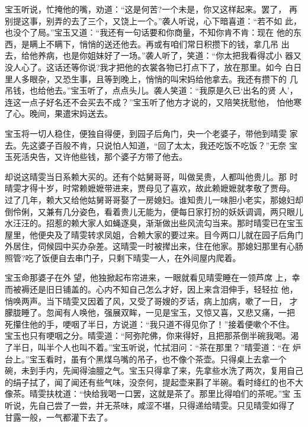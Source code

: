 宝玉听说，忙掩他的嘴，劝道：“这是何苦?一个未是，你又这样起来。罢了，
再别提这事，别弄的去了三个，又饶上一个。”袭人听说，心下暗喜道：“若不如
此，也没个了局。”宝玉又道：“我还有一句话要和你商量，不知你肯不肯：现在
他的东西，是瞒上不瞒下，悄悄的送还他去。再或有咱们常日积攒下的钱，拿几吊
出去，给他养病，也是你姐妹好了一场。”袭人听了，笑道：“你太把我看得忒小
器又没人心了。这话还等你说?我才把他的衣裳各物已打点下了，放在那里。如今
白日里人多眼杂，又恐生事，且等到晚上，悄悄的叫宋妈给他拿去。我还有攒下的
几吊钱，也给他去。”宝玉听了，点点头儿。袭人笑道：“我原是久已‘出名的贤
人’，连这一点子好名还不会买去不成？”宝玉听了他方才说的，又陪笑抚慰他，
怕他寒了心。晚间，果遣宋妈送去。

宝玉将一切人稳住，便独自得便，到园子后角门，央一个老婆子，带他到晴雯
家去。先这婆子百般不肯，只说怕人知道，“回了太太，我还吃饭不吃饭？”无奈
宝玉死活央告，又许他些钱，那个婆子方带了他去。

却说这晴雯当日系赖大买的。还有个姑舅哥哥，叫做吴贵，人都叫他贵儿。那
时晴雯才得十岁，时常赖嬷嬷带进来，贾母见了喜欢，故此赖嬷嬷就孝敬了贾母。
过了几年，赖大又给他姑舅哥哥娶了一房媳妇。谁知贵儿一味胆小老实，那媳妇却
倒伶俐，又兼有几分姿色，看着贵儿无能为，便每日家打扮的妖妖调调，两只眼儿
水汪汪的。招惹的赖大家人如蝇逐臭，渐渐做出些风流勾当来。那时晴雯已在宝玉
屋里，他便央及了晴雯转求凤姐，合赖大家的要过来。目今两口儿就在园子后角门
外居住，伺候园中买办杂差。这晴雯一时被撵出来，住在他家。那媳妇那里有心肠
照管?吃了饭便自去串门子，只剩下晴雯一人，在外间屋内爬着。

宝玉命那婆子在外望，他独掀起布帘进来，一眼就看见晴雯睡在一领芦席
上，幸而被褥还是旧日铺盖的。心内不知自己怎么才好，因上来含泪伸手，轻轻拉
他，悄唤两声。当下晴雯又因着了风，又受了哥嫂的歹话，病上加病，嗽了一日，
才朦胧睡了。忽闻有人唤他，强展双眸，一见是宝玉，又惊又喜，又悲又痛，一把
死攥住他的手，哽咽了半日，方说道：“我只道不得见你了！”接着便嗽个不住。
宝玉也只有哽咽之分。晴雯道：“阿弥陀佛，你来得好，且把那茶倒半碗我喝。渴
了半日，叫半个人也叫不着。”宝玉听说，忙拭泪问：“茶在那里？”晴雯道：“在
炉台上。”宝玉看时，虽有个黑煤乌嘴的吊子，也不像个茶壶。只得桌上去拿一个
碗，未到手内，先闻得油膻之气。宝玉只得拿了来，先拿些水洗了两次，复用自己
的绢子拭了，闻了闻还有些气味，没奈何，提起壶来斟了半碗。看时绛红的也不大
像茶。晴雯扶枕道：“快给我喝一口罢，这就是茶了。那里比得咱们的茶呢。”宝
玉听说，先自己尝了一尝，并无茶味，咸涩不堪，只得递给晴雯。只见晴雯如得了
甘露一般，一气都灌下去了。

